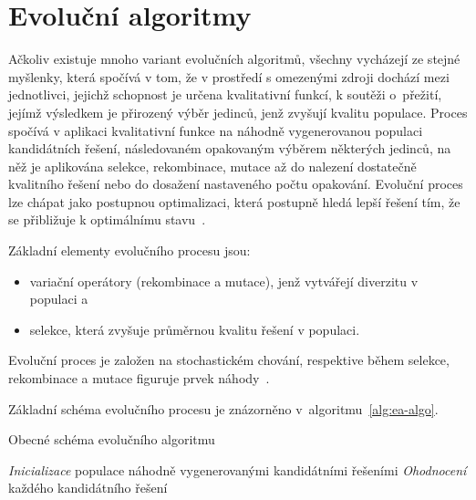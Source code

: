 \section{Evoluční algoritmy}
Ačkoliv existuje mnoho variant evolučních algoritmů, všechny vycházejí ze stejné myšlenky, která spočívá v tom, že v prostředí s omezenými zdroji dochází mezi jednotlivci, jejichž schopnost je určena kvalitativní funkcí, k soutěži o~přežití, jejímž výsledkem je přirozený výběr jedinců, jenž zvyšují kvalitu populace. 
Proces spočívá v aplikaci kvalitativní funkce na náhodně vygenerovanou populaci kandidátních řešení, následovaném opakovaným výběrem některých jedinců, na něž je aplikována selekce, rekombinace, mutace až do nalezení dostatečně kvalitního řešení nebo do dosažení nastaveného počtu opakování.  
Evoluční proces lze chápat jako postupnou optimalizaci, která postupně hledá lepší řešení tím, že se přibližuje k optimálnímu stavu~\cite{IntroductionToEvoComputing}. 

Základní elementy evolučního procesu jsou:
\begin{itemize}
    \item variační operátory (rekombinace a mutace), jenž vytvářejí diverzitu v populaci a
    \item selekce, která zvyšuje průměrnou kvalitu řešení v populaci.
\end{itemize}
Evoluční proces je založen na stochastickém chování, respektive během selekce, rekombinace a mutace figuruje prvek náhody~\cite{IntroductionToEvoComputing}. 

Základní schéma evolučního procesu je znázorněno v~algoritmu~\ref{alg:ea-algo}.

\begin{algorithm}[H]
    \caption{Obecné schéma evolučního algoritmu~\cite{IntroductionToEvoComputing}}
    \label{alg:ea-algo}
    \emph{Inicializace} populace náhodně vygenerovanými kandidátními řešeními\;
    \emph{Ohodnocení} každého kandidátního řešení\;
\end{algorithm}

